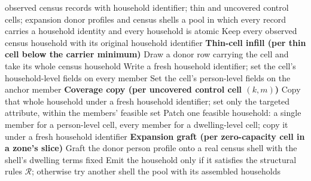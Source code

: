 \documentclass[review]{elsarticle}
\begin{document}
\begin{algorithm}[H]
\caption{Household assembly in the constructed pool}
\begin{algorithmic}[1]
\Require observed census records with household identifier; thin and uncovered control cells; expansion donor profiles and census shells
\Ensure a pool in which every record carries a household identity and every household is atomic
\State Keep every observed census household with its original household identifier
\Statex \textbf{Thin-cell infill (per thin cell below the carrier minimum)}
    \State Draw a donor row carrying the cell and take its whole census household
    \State Write a fresh household identifier; set the cell's household-level fields on every member
    \State Set the cell's person-level fields on the anchor member
\EndFor
\Statex \textbf{Coverage copy (per uncovered control cell $(k,m)$)}
        \State Copy that whole household under a fresh household identifier; set only the targeted attribute, within the members' feasible set
    \Else
        \State Patch one feasible household: a single member for a person-level cell, every member for a dwelling-level cell; copy it under a fresh household identifier
    \EndIf
\EndFor
\Statex \textbf{Expansion graft (per zero-capacity cell in a zone's slice)}
    \State Graft the donor person profile onto a real census shell with the shell's dwelling terms fixed
    \State Emit the household only if it satisfies the structural rules $\mathcal{R}$; otherwise try another shell
\EndFor
\State \Return the pool with its assembled households
\end{algorithmic}
\label{alg:table}
\end{algorithm}




\end{document}
